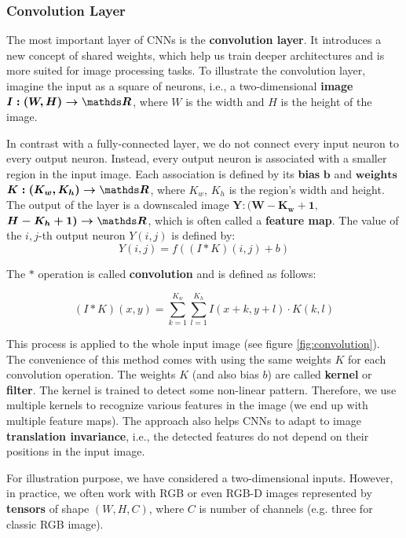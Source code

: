 \subsubsection{Convolution Layer}
The most important layer of CNNs is the \textbf{convolution layer}. It introduces a new concept of shared weights, which help us train deeper architectures and is more suited for image processing tasks. To illustrate the convolution layer, imagine the input as a square of neurons, i.e., a two-dimensional \textbf{image} $\boldsymbol{I: (W, H) \rightarrow \real}$, where ${W}$ is the width and ${H}$ is the height of the image. 

In contrast with a fully-connected layer, we do not connect every input neuron to every output neuron. Instead, every output neuron is associated with a smaller region in the input image. Each association is defined by its \textbf{bias} $\boldsymbol{b}$ and $\textbf{weights}$ $\boldsymbol{K:(K_w, K_h) \rightarrow \real}$, where $K_w$, $K_h$ is the region's width and height. The output of the layer is a downscaled image $\boldsymbol{Y:(W - K_w + 1,}$ $\boldsymbol{H - K_h + 1)  \rightarrow \real}$, which is often called a \textbf{feature map}. The value of the $i, j$-th output neuron $Y(i,j)$ is defined by: 
$$
Y(i, j) = f\left((I * K)(i,j) + b\right)
$$

The $*$ operation is called \textbf{convolution} and is defined as follows:

$$
(I * K)(x, y) = \sum\limits_{k = 1}^{K_w}\sum\limits_{l = 1}^{K_h} I(x + k, y + l) \cdot K(k, l)
$$

This process is applied to the whole input image (see figure \ref{fig:convolution}). The convenience of this method comes with using the same weights $K$ for each convolution operation. The weights $K$ (and also bias $b$) are called \textbf{kernel} or \textbf{filter}. The kernel is trained to detect some non-linear pattern. Therefore, we use multiple kernels to recognize various features in the image (we end up with multiple feature maps). The approach also helps CNNs to adapt to image \textbf{translation invariance}, i.e., the detected features do not depend on their positions in the input image.

For illustration purpose, we have considered a two-dimensional inputs. However, in practice, we often work with RGB or even RGB-D images represented by \textbf{tensors} of shape $(W, H, C)$, where $C$ is number of channels (e.g. three for classic RGB image). 

